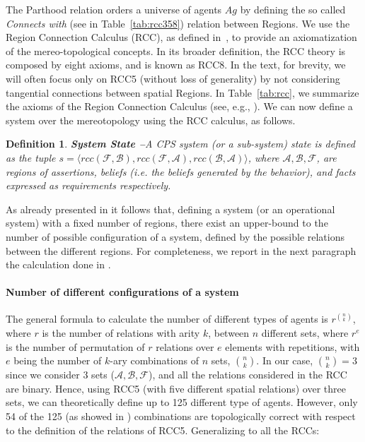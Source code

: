 \documentclass[conference]{IEEEtran}
\newcommand{\assertionRegion}{\mathcal{A}}
\newcommand{\beliefRegion}{\mathcal{B}}
\newcommand{\factRegion}{\mathcal{F}}
\newcommand{\rcc}{rcc}
\newcommand{\agentuniverse}{Ag}
\newtheorem{definition}{Definition}%
\begin{document}
The Parthood relation orders a universe of agents $\agentuniverse$ by defining the so called
\emph{Connects with} (see in Table~\ref{tab:rcc358}) relation between Regions.
We use the
Region Connection Calculus (RCC), as defined
in~\cite{bennettLogics,improvingRCC}, to provide an axiomatization of the
mereo-topological concepts. In its broader definition, the RCC theory is composed
by eight axioms, and is known as RCC8. In the text, for brevity, 
we will often focus only on RCC5 (without
loss of generality) by not considering tangential connections between spatial
Regions. In Table~\ref{tab:rcc}, we
summarize the axioms of the Region Connection Calculus (see, e.g., \autocite{Grutter2008rcc}).
We can now define a system over the mereotopology using the RCC calculus, as follows.

\begin{definition}{\bf System State --}\label{def:opsystem}
	A CPS system (or a sub-system) state is defined as the tuple
	$s=\langle\rcc(\factRegion,\beliefRegion),\rcc(\factRegion,\assertionRegion),\rcc(\beliefRegion,\assertionRegion)\rangle$,
	where $\assertionRegion,\beliefRegion,\factRegion$, are regions of
	assertions, beliefs (i.e. the beliefs generated by the behavior), and
	facts expressed as requirements respectively.
\end{definition}

As already presented in \autocite{Santaca2016abf} it follows that, defining
a system (or an operational system) with a fixed number of regions, there exist
an upper-bound to the number of possible configuration of a system, defined by
the possible relations between the different regions.
For completeness, we report in the next paragraph 
the calculation done in \autocite{Santaca2016abf}.

\paragraph{Number of different configurations of a system}
The general formula to calculate the number of different types of agents is
$r^{\binom{n}{k}}$, where $r$ is the number of relations with arity $k$,
between $n$ different sets, where $r^e$ is the number of permutation of $r$
relations over $e$ elements with repetitions, with $e$ being the number of
$k$-ary combinations of $n$ sets, $\binom{n}{k}$.
In our case, $\binom{n}{k}=3$ since we consider $3$ sets
($\assertionRegion,\beliefRegion,\factRegion$), and all the relations
considered in the RCC are binary.  Hence, using RCC5 (with five different
spatial relations) over three sets, we can theoretically define up to 125
different type of agents. However, only 54 of the 125 (as showed in
\cite{improvingRCC}) combinations are topologically correct with respect to
the definition of the relations of RCC5. Generalizing to all the RCCs:
\end{document}

